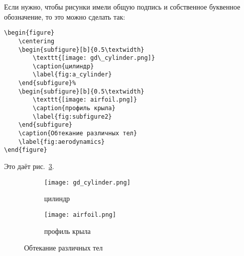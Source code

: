 \documentclass[../homework.tex]{subfiles}
\begin{document}
Если нужно, чтобы рисунки имели общую подпись и собственное буквенное обозначение, то это можно сделать так:

{\small
\begin{verbatim}
\begin{figure}
    \centering
    \begin{subfigure}[b]{0.5\textwidth}
        \texttt{[image: gd\_cylinder.png]}
        \caption{цилиндр}
        \label{fig:a_cylinder}
    \end{subfigure}%
    \begin{subfigure}[b]{0.5\textwidth}
        \texttt{[image: airfoil.png]}
        \caption{профиль крыла}
        \label{fig:subfigure2}
    \end{subfigure}
    \caption{Обтекание различных тел}
    \label{fig:aerodynamics}
\end{figure}
\end{verbatim}
}

\noindent
Это даёт рис.~\ref{fig:aerodynamics}.

\figspace
\begin{figure}[h]
    \centering
    \begin{subfigure}[b]{0.5\textwidth}
        \texttt{[image: gd\_cylinder.png]}
        \caption{цилиндр}
        \label{fig:a_cylinder}
    \end{subfigure}%
    \begin{subfigure}[b]{0.5\textwidth}
        \texttt{[image: airfoil.png]}
        \caption{профиль крыла}
        \label{fig:subfigure2}
    \end{subfigure}
    \caption{Обтекание различных тел}
    \label{fig:aerodynamics}
\end{figure}
\figspace
\end{document}
